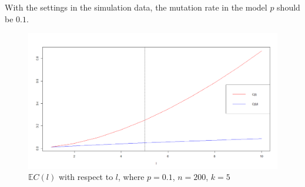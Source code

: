 \documentclass[xcolor=dvipsnames]{beamer}
\begin{document}
\begin{frame}
With the settings in the simulation data, the mutation rate in the model $p$ should be $0.1$.\\
\begin{figure}
\centering
\includegraphics[width=0.9\linewidth]{theorycover.png}
\caption{$\mathbb{E}C(l)$ with respect to $l$, where $p=0.1$, $n=200$, $k=5$}
\end{figure}
\end{frame}

\end{document}

